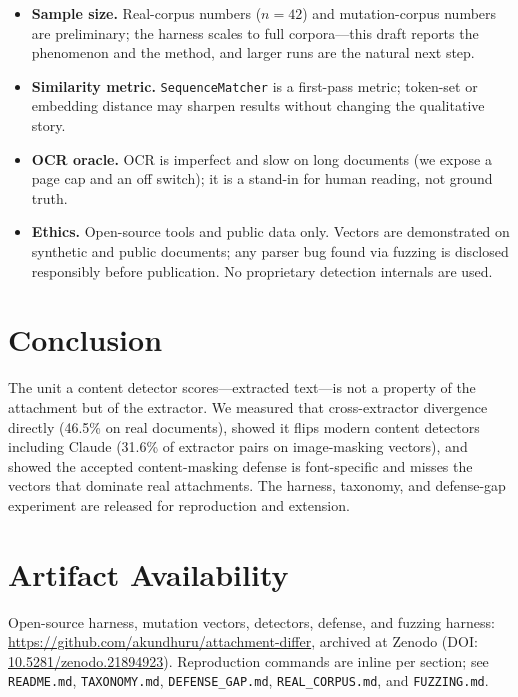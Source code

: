 \documentclass[11pt]{article}
\newcommand{\code}[1]{\texttt{#1}}
\begin{document}
\begin{itemize}
  \item \textbf{Sample size.} Real-corpus numbers ($n=42$) and mutation-corpus
  numbers are preliminary; the harness scales to full corpora---this draft
  reports the phenomenon and the method, and larger runs are the natural next
  step.
  \item \textbf{Similarity metric.} \code{SequenceMatcher} is a first-pass
  metric; token-set or embedding distance may sharpen results without changing
  the qualitative story.
  \item \textbf{OCR oracle.} OCR is imperfect and slow on long documents (we
  expose a page cap and an off switch); it is a stand-in for human reading, not
  ground truth.
  \item \textbf{Ethics.} Open-source tools and public data only. Vectors are
  demonstrated on synthetic and public documents; any parser bug found via
  fuzzing is disclosed responsibly before publication. No proprietary detection
  internals are used.
\end{itemize}

\section{Conclusion}

The unit a content detector scores---extracted text---is not a property of the
attachment but of the extractor. We measured that cross-extractor divergence
directly (46.5\% on real documents), showed it flips modern content detectors
including Claude (31.6\% of extractor pairs on image-masking vectors), and showed
the accepted content-masking defense is font-specific and misses the vectors
that dominate real attachments. The harness, taxonomy, and defense-gap
experiment are released for reproduction and extension.

\section*{Artifact Availability}

Open-source harness, mutation vectors, detectors, defense, and fuzzing harness:
\url{https://github.com/akundhuru/attachment-differ}, archived at Zenodo
(DOI: \href{https://doi.org/10.5281/zenodo.21894923}{10.5281/zenodo.21894923}).
Reproduction commands are inline per section; see \code{README.md},
\code{TAXONOMY.md},
\code{DEFENSE\_GAP.md}, \code{REAL\_CORPUS.md}, and \code{FUZZING.md}.



\end{document}
